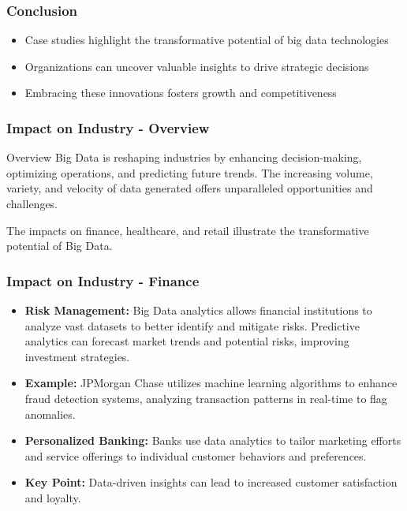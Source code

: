 \documentclass[aspectratio=169]{beamer}
\begin{document}
\begin{frame}[fragile]
    \frametitle{Conclusion}
    \begin{itemize}
        \item Case studies highlight the transformative potential of big data technologies
        \item Organizations can uncover valuable insights to drive strategic decisions
        \item Embracing these innovations fosters growth and competitiveness
    \end{itemize}
\end{frame}

\begin{frame}[fragile]
    \frametitle{Impact on Industry - Overview}
    \begin{block}{Overview}
        Big Data is reshaping industries by enhancing decision-making, optimizing operations, and predicting future trends. The increasing volume, variety, and velocity of data generated offers unparalleled opportunities and challenges.
    \end{block}
    The impacts on finance, healthcare, and retail illustrate the transformative potential of Big Data.
\end{frame}

\begin{frame}[fragile]
    \frametitle{Impact on Industry - Finance}
    \begin{itemize}
        \item \textbf{Risk Management:} 
        Big Data analytics allows financial institutions to analyze vast datasets to better identify and mitigate risks. Predictive analytics can forecast market trends and potential risks, improving investment strategies.
        
        \item \textbf{Example:} 
        JPMorgan Chase utilizes machine learning algorithms to enhance fraud detection systems, analyzing transaction patterns in real-time to flag anomalies.

        \item \textbf{Personalized Banking:} 
        Banks use data analytics to tailor marketing efforts and service offerings to individual customer behaviors and preferences. 

        \item \textbf{Key Point:} 
        Data-driven insights can lead to increased customer satisfaction and loyalty.
    \end{itemize}
\end{frame}
\end{document}
